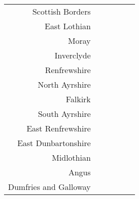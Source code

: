\documentclass[
  12pt,
]{article}
\begin{document}
\begin{longtable}[t]{rrrrrr}
Scottish Borders & \cellcolor{white}{ 247.5\%} & \cellcolor{white}{ 224.1\%} & \cellcolor{white}{ 234.5\%} & \cellcolor{white}{ 179.0\%} & \cellcolor{white}{ 336.2\%}\\
East Lothian & \cellcolor{white}{} & \cellcolor{white}{ 202.4\%} & \cellcolor{white}{ 101.1\%} & \cellcolor{white}{ 100.2\%} & \cellcolor{white}{  95.8\%}\\
Moray & \cellcolor{white}{  62.4\%} & \cellcolor{white}{  52.5\%} & \cellcolor{white}{  64.2\%} & \cellcolor{white}{  40.1\%} & \cellcolor{white}{  54.0\%}\\
Inverclyde & \cellcolor{white}{  90.5\%} & \cellcolor{white}{  89.9\%} & \cellcolor{white}{ 100.3\%} & \cellcolor{white}{  91.3\%} & \cellcolor{white}{  95.1\%}\\
Renfrewshire & \cellcolor{white}{  34.5\%} & \cellcolor{white}{  27.5\%} & \cellcolor{white}{  41.5\%} & \cellcolor{white}{  53.3\%} & \cellcolor{white}{  50.2\%}\\
North Ayrshire & \cellcolor{white}{ 169.1\%} & \cellcolor{white}{ 172.3\%} & \cellcolor{white}{ 236.2\%} & \cellcolor{white}{ 204.6\%} & \cellcolor{white}{ 238.2\%}\\
Falkirk & \cellcolor{white}{ 100.0\%} & \cellcolor{white}{  69.3\%} & \cellcolor{white}{  66.9\%} & \cellcolor{white}{  61.2\%} & \cellcolor{white}{  55.7\%}\\
South Ayrshire & \cellcolor{white}{} & \cellcolor{white}{  59.5\%} & \cellcolor{white}{  65.3\%} & \cellcolor{white}{  50.0\%} & \cellcolor{white}{  58.0\%}\\
East Renfrewshire & \cellcolor{white}{ 179.1\%} & \cellcolor{white}{ 159.7\%} & \cellcolor{white}{ 174.1\%} & \cellcolor{white}{ 181.6\%} & \cellcolor{white}{ 267.5\%}\\
East Dunbartonshire & \cellcolor{white}{1035.8\%} & \cellcolor{white}{ 185.3\%} & \cellcolor{white}{ 158.8\%} & \cellcolor{white}{  86.7\%} & \cellcolor{white}{  69.6\%}\\
Midlothian & \cellcolor{white}{} & \cellcolor{white}{} & \cellcolor{white}{} & \cellcolor{white}{ 184.5\%} & \cellcolor{white}{ 138.4\%}\\
Angus & \cellcolor{white}{1900.0\%} & \cellcolor{white}{3166.7\%} & \cellcolor{white}{} & \cellcolor{white}{  39.6\%} & \cellcolor{white}{  35.4\%}\\
Dumfries and Galloway & \cellcolor{white}{1771.4\%} & \cellcolor{white}{1400.0\%} & \cellcolor{white}{1252.9\%} & \cellcolor{white}{1818.2\%} & \cellcolor{white}{2500.0\%}\\

\end{longtable}
\end{document}
